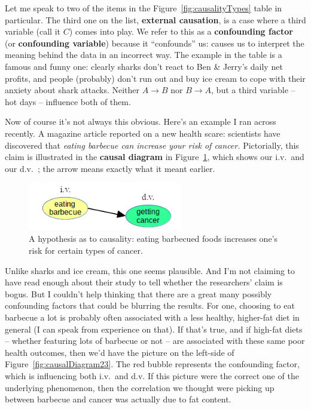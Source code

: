 
Let me speak to two of the items in the Figure~\ref{fig:causalityTypes} table
in particular. The third one on the list, \textbf{external causation}, is a
case where a third variable (call it $C$) comes into play. We refer to this as
a \textbf{confounding factor} (or \textbf{confounding variable}) because it
``confounds'' us: causes us to interpret the meaning behind the data in an
incorrect way. The example in the table is a famous and funny one: clearly
sharks don't react to Ben \& Jerry's daily net profits, and people (probably)
don't run out and buy ice cream to cope with their anxiety about shark attacks.
Neither $A \rightarrow B$ nor $B \rightarrow A$, but a third variable -- hot
days -- influence both of them.

\label{barbecue}

Now of course it's not always this obvious. Here's an example I ran across
recently. A magazine article reported on a new health scare: scientists have
discovered that \textit{eating barbecue can increase your risk of cancer.}
Pictorially, this claim is illustrated in the \textbf{causal diagram} in
Figure~\ref{fig:causalDiagram}, which shows our i.v.~and our d.v.~; the arrow
means exactly what it meant earlier.

\begin{figure}[ht]
\centering
\includegraphics[width=0.6\textwidth]{causalDiagram.png}
\caption{A hypothesis as to causality: eating barbecued foods increases one's
risk for certain types of cancer.}
\label{fig:causalDiagram}
\end{figure}

Unlike sharks and ice cream, this one seems plausible. And I'm not claiming to
have read enough about their study to tell whether the researchers' claim is
bogus. But I couldn't help thinking that there are a great many possibly
confounding factors that could be blurring the results. For one, choosing to
eat barbecue a lot is probably often associated with a less healthy, higher-fat
diet in general (I can speak from experience on that). If that's true, and if
high-fat diets -- whether featuring lots of barbecue or not -- are associated
with these same poor health outcomes, then we'd have the picture on the
left-side of Figure~\ref{fig:causalDiagram23}. The red bubble represents the
confounding factor, which is influencing both i.v.~and d.v. If this picture
were the correct one of the underlying phenomenon, then the correlation we
thought were picking up between barbecue and cancer was actually due to fat
content.

